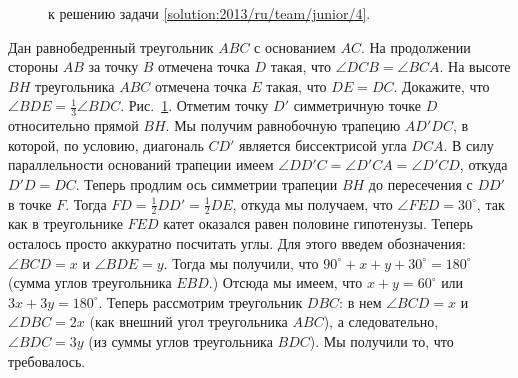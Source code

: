 \ifsolution
\begin{figure}\centering
    \caption{к решению задачи \ref{solution:2013/ru/team/junior/4}.}
    \label{fig:solution:2013/ru/team/junior/4}
\end{figure}%
\fi %

\problem{}
Дан равнобедренный треугольник $ABC$ с основанием $AC$.
На продолжении стороны $AB$ за точку $B$ отмечена точка $D$ такая, что
$\angle DCB = \angle BCA$.
На высоте $BH$ треугольника $ABC$ отмечена точка $E$ такая, что $DE = DC$.
Докажите, что $\angle BDE = \frac{1}{3} \angle BDC$. 
\solution
\label{solution:2013/ru/team/junior/4}
Рис.~\ref{fig:solution:2013/ru/team/junior/4}.
Отметим точку $D'$ симметричную точке $D$ относительно прямой $BH$.
Мы получим равнобочную трапецию $AD'DC$, в которой, по условию, диагональ $CD'$
является биссектрисой угла $DCA$.
В силу параллельности оснований трапеции имеем
$\angle D D' C = \angle D' C A = \angle D' C D$, откуда $D'D = DC$.
Теперь продлим ось симметрии трапеции $BH$ до пересечения с $DD'$ в точке $F$.
Тогда $FD = \frac{1}{2} DD' = \frac{1}{2} DE$, откуда мы получаем, что
$\angle FED = 30^\circ$, так как в треугольнике $FED$ катет оказался равен
половине гипотенузы.
Теперь осталось просто аккуратно посчитать углы.
Для этого введем обозначения: $\angle BCD = x$ и $\angle BDE = y$.
Тогда мы получили, что $90^\circ + x + y + 30^\circ = 180^\circ$
(сумма углов треугольника $EBD$.)
Отсюда мы имеем, что $x + y = 60^\circ$ или $3 x + 3 y = 180^\circ$.
Теперь рассмотрим треугольник $DBC$: в нем $\angle BCD = x$ и
$\angle DBC = 2 x$ (как внешний угол треугольника $ABC$), а следовательно,
$\angle BDC = 3 y$ (из суммы углов треугольника $BDC$).
Мы получили то, что требовалось.
\endproblem
